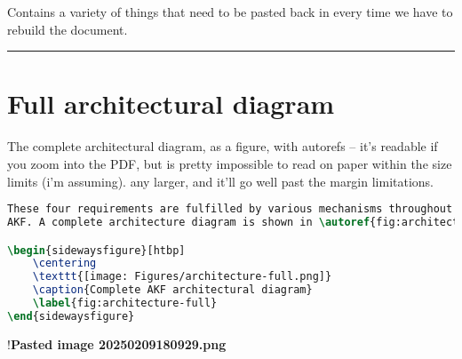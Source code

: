 Contains a variety of things that need to be pasted back in every time
we have to rebuild the document.

\begin{center}\rule{0.5\linewidth}{0.5pt}\end{center}

\section{Full architectural diagram}\label{full-architectural-diagram}

The complete architectural diagram, as a figure, with autorefs -- it's
readable if you zoom into the PDF, but is pretty impossible to read on
paper within the size limits (i'm assuming). any larger, and it'll go
well past the margin limitations.

\begin{lstlisting}[language=TeX]
These four requirements are fulfilled by various mechanisms throughout
AKF. A complete architecture diagram is shown in \autoref{fig:architecture-full}. 

\begin{sidewaysfigure}[htbp]
    \centering
    \texttt{[image: Figures/architecture-full.png]}
    \caption{Complete AKF architectural diagram}
    \label{fig:architecture-full}
\end{sidewaysfigure}   
\end{lstlisting}

!\textbf{Pasted image 20250209180929.png}
